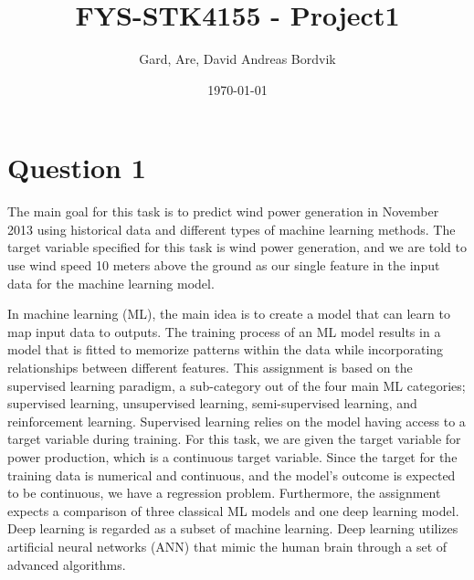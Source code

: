 \documentclass[11pt]{article}
\title{FYS-STK4155 - Project1}
\author{Gard, Are, David Andreas Bordvik}
\date{\today}
\begin{document}
\maketitle

\section*{Question 1}
The main goal for this task is to predict wind power generation in November 2013 using historical data and different types of machine learning methods. The target variable specified for this task is wind power generation, and we are told to use wind speed 10 meters above the ground as our single feature in the input data for the machine learning model.

In machine learning (ML), the main idea is to create a model that can learn to map input data to outputs. The training process of an ML model results in a model that is fitted to memorize patterns within the data while incorporating relationships between different features. This assignment is based on the supervised learning paradigm, a sub-category out of the four main ML categories; supervised learning, unsupervised learning, semi-supervised learning, and reinforcement learning. Supervised learning relies on the model having access to a target variable during training. For this task, we are given the target variable for power production, which is a continuous target variable. Since the target for the training data is numerical and continuous, and the model's outcome is expected to be continuous, we have a regression problem. Furthermore, the assignment expects a comparison of three classical ML models and one deep learning model. Deep learning is regarded as a subset of machine learning. Deep learning utilizes artificial neural networks (ANN) that mimic the human brain through a set of advanced algorithms. 
\end{document}

